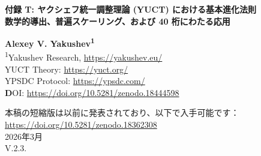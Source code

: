 \documentclass[12pt,a4paper]{article}
\newcommand{\Keff}{K_{\mathrm{eff}}}
\newcommand{\kappac}{\kappa_c}
\newcommand{\eps}{\varepsilon}
\theoremstyle{remark}
\begin{document}
	
	\begin{titlepage}
		\begin{center}
			\vspace*{1cm}
			
			\Huge\textbf{付録 T: ヤクシェフ統一調整理論 (YUCT) における基本進化法則} \\
			\vspace{0.5cm}
			\Large\textbf{数学的導出、普遍スケーリング、および 40 桁にわたる応用}
			
			\vspace{1.5cm}
			
			\Large\textbf{Alexey V. Yakushev\textsuperscript{1}} \\
			
			
			\vspace{0.3cm}
			\large
			\textsuperscript{1}Yakushev Research, \url{https://yakushev.eu/} \\
			
			\vspace{1cm}
			\large
			YUCT Theory: \url{https://yuct.org/}\\
			YPSDC Protocol: \url{https://ypsdc.com/}\\
			
			\vspace{2cm}
			\textbf DOI: \url{https://doi.org/10.5281/zenodo.18444598}\\
			
			\vspace{1cm}
			
			\vspace{0cm}
			\large 
			本稿の短縮版は以前に発表されており、以下で入手可能です：\\ \url{https://doi.org/10.5281/zenodo.18362308}\\
			\vspace{1cm}
			2026年3月 \\ \large V.2.3.
			
			\vspace{2cm}
			
			\begin{minipage}{0.9\textwidth}
				\begin{abstract}
					\noindent
					本付録は、ヤクシェフ統一調整理論（YUCT）における基本進化法則の完全な数学的定式化を提示する。我々は、分子系から銀河構造に至るすべてのスケールでの進化が、調整効率 \(\Keff\) の最適化によって支配されることを示す。YUCT の第一原理から出発して、普遍誤差スケーリング則 \(\eps = \kappac \alpha \Keff^{-\beta}\) （\(\beta = 0.67 \pm 0.03\)、\(\kappac = 0.33\)）を導出する。この法則は 40 桁にわたって成立し、DNA の突然変異率、社会崩壊の確率、銀河回転曲線、宇宙論的パラメータを決定する。我々は基本進化方程式 \(\partial_t K = rK(1-K/K_{\mathrm{opt}}) - \mu K \eps(K) + D\nabla^2 K + \xi(t)\) を導入し、以下に適用する：(1) 細菌および脊椎動物の遺伝的進化、(2) 種分化ダイナミクス、(3) 社会システムと帝国崩壊、(4) 宇宙インフレーションと構造形成、(5) 核連鎖反応、(6) 生命の起源。この理論は、独立したデータ（白色矮星の赤方偏移、GRACE 衛星異常、地球–月潮汐進化、68 種の脊椎動物のゲノム突然変異率）に対して検証された定量的予測を与える。生命出現の臨界調整閾値は \(K_{\mathrm{crit}} \approx 150\) であり、初期地球における生命の急速な出現を説明する。
					

\end{abstract}
\end{minipage}
\end{center}
\end{titlepage}
\end{document}
